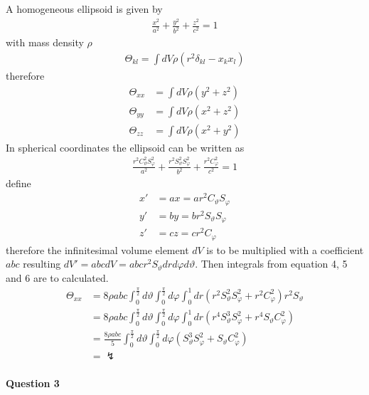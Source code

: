 \documentclass[11pt,a4paper]{article}
\begin{document}
A homogeneous ellipsoid is given by
\begin{align}
\frac{x^2}{a^2}+\frac{y^2}{b^2}+\frac{z^2}{c^2}=1
\end{align}
with mass density $\rho$
\begin{align}
\Theta_{kl}=\int dV \rho (r^2\delta_{kl}-x_k x_l)
\end{align}
therefore
\begin{align}
\Theta_{xx}&=\int dV \rho (y^2+z^2) \\
\Theta_{yy}&=\int dV \rho (x^2+z^2) \\
\Theta_{zz}&=\int dV \rho (x^2+y^2)
\end{align}
In spherical coordinates the ellipsoid can be written as
\begin{align}
\frac{r^2 C^2_\vartheta S^2_\varphi}{a^2}+
\frac{r^2 S^2_\vartheta S^2_\varphi}{b^2}+
\frac{r^2 C^2_\varphi}{c^2}=1
\end{align}
define
\begin{align}
x'&=ax=ar^2 C_\vartheta S_\varphi \\
y'&=by=br^2 S_\vartheta S_\varphi \\
z'&=cz=cr^2 C_\varphi
\end{align}
therefore the infinitesimal volume element $dV$ is to be multiplied with a coefficient $abc$ resulting $dV'=abc dV=abcr^2 S_\vartheta drd\varphi d\vartheta$.
Then integrals from equation 4, 5 and 6 are to calculated.
\begin{align}
\Theta_{xx}
&=8\rho abc \int_0^{\frac{\pi}{2}} d\vartheta \int_0^{\frac{\pi}{2}} d\varphi \int_0^1 dr
(r^2 S^2_\vartheta S^2_\varphi+r^2 C^2_\varphi)r^2 S_\vartheta \\
&=8\rho abc \int_0^{\frac{\pi}{2}} d\vartheta \int_0^{\frac{\pi}{2}} d\varphi \int_0^1 dr
(r^4 S^3_\vartheta S^2_\varphi+r^4 S_\vartheta C^2_\varphi) \\
&=\frac{8\rho abc}{5} \int_0^{\frac{\pi}{2}} d\vartheta \int_0^{\frac{\pi}{2}} d\varphi
(S^3_\vartheta S^2_\varphi+S_\vartheta C^2_\varphi) \\
&=\lightning
\end{align}

\newpage

\paragraph{Question 3}
\end{document}
